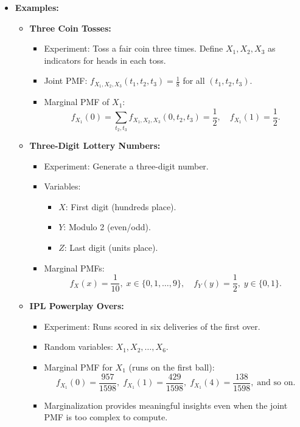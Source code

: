 \documentclass{article}
\begin{document}
\begin{itemize}
  \item \textbf{Examples:}
    \begin{itemize}
      \item \textbf{Three Coin Tosses:}
        \begin{itemize}
          \item Experiment: Toss a fair coin three times. Define $X_1, X_2, X_3$ as indicators for heads in each toss.
          \item Joint PMF: $f_{X_1, X_2, X_3}(t_1, t_2, t_3) = \frac{1}{8}$ for all $(t_1, t_2, t_3)$.
          \item Marginal PMF of $X_1$:
            \[
              f_{X_1}(0) = \sum_{t_2, t_3} f_{X_1, X_2, X_3}(0, t_2, t_3) = \frac{1}{2}, \quad f_{X_1}(1) = \frac{1}{2}.
            \]
        \end{itemize}
      \item \textbf{Three-Digit Lottery Numbers:}
        \begin{itemize}
          \item Experiment: Generate a three-digit number.
          \item Variables:
            \begin{itemize}
              \item $X$: First digit (hundreds place).
              \item $Y$: Modulo 2 (even/odd).
              \item $Z$: Last digit (units place).
            \end{itemize}
          \item Marginal PMFs:
            \[
              f_X(x) = \frac{1}{10}, \; x \in \{0, 1, \dots, 9\}, \quad f_Y(y) = \frac{1}{2}, \; y \in \{0, 1\}.
            \]
        \end{itemize}
      \item \textbf{IPL Powerplay Overs:}
        \begin{itemize}
          \item Experiment: Runs scored in six deliveries of the first over.
          \item Random variables: $X_1, X_2, \dots, X_6$.
          \item Marginal PMF for $X_1$ (runs on the first ball):
            \[
              f_{X_1}(0) = \frac{957}{1598}, \; f_{X_1}(1) = \frac{429}{1598}, \; f_{X_1}(4) = \frac{138}{1598}, \; \text{and so on.}
            \]
          \item Marginalization provides meaningful insights even when the joint PMF is too complex to compute.
        \end{itemize}
    \end{itemize}


\end{itemize}
\end{document}
